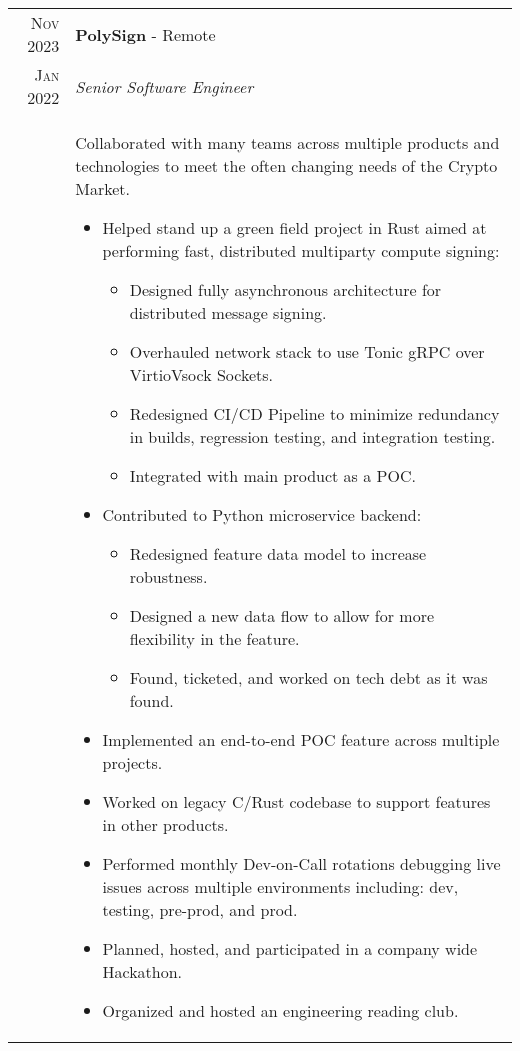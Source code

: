 \documentclass[a4paper,12pt]{article}
\begin{document}
%
%
\begin{tabularx}{\textwidth}{r|X}
   \textsc{Nov 2023} & \textbf{PolySign} \-- Remote \\
   \textsc{Jan 2022} & \emph{Senior Software Engineer}\\
   & \small{Collaborated with many teams across multiple products and technologies to meet the often changing needs of the Crypto Market.
      \begin{itemize}[leftmargin=20pt,topsep=1pt,itemsep=1pt,partopsep=0pt, parsep=1pt]
        \item Helped stand up a green field project in Rust aimed at performing fast, distributed multiparty compute signing:
            \begin{itemize}[leftmargin=20pt,topsep=1pt,itemsep=1pt,partopsep=0pt, parsep=1pt]
              \item Designed fully asynchronous architecture for distributed message signing.
              \item Overhauled network stack to use Tonic gRPC over VirtioVsock Sockets.
              \item Redesigned CI/CD Pipeline to minimize redundancy in builds, regression testing, and integration testing.
              \item Integrated with main product as a POC.
            \end{itemize}
        \item Contributed to Python microservice backend:
            \begin{itemize}[leftmargin=20pt,topsep=1pt,itemsep=1pt,partopsep=0pt, parsep=1pt]
              \item Redesigned feature data model to increase robustness.
              \item Designed a new data flow to allow for more flexibility in the feature.
              \item Found, ticketed, and worked on tech debt as it was found.
            \end{itemize}
        \item Implemented an end-to-end POC feature across multiple projects.
        \item Worked on legacy C/Rust codebase to support features in other products.
        \item Performed monthly Dev-on-Call rotations debugging live issues across multiple environments including: dev, testing, pre-prod, and prod.
        \item Planned, hosted, and participated in a company wide Hackathon.
        \item Organized and hosted an engineering reading club.
      \vspace{-0.5cm}
      \end{itemize}}\\
\end{tabularx}
\end{document}
